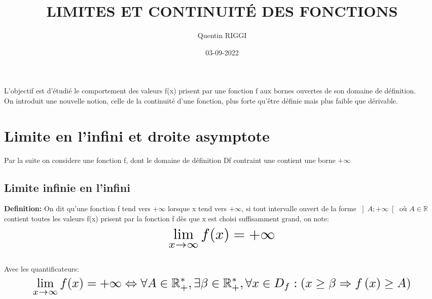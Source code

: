 \documentclass[a4paper, 12pt]{article}
\title{\color{darkred}\Huge LIMITES ET CONTINUITÉ DES FONCTIONS}
\date{03-09-2022}
\author{Quentin RIGGI}
\renewcommand\large{\color{text}}
\begin{document}
	\maketitle
	\large L'objectif est d'étudié le comportement des valeurs f(x) prisent par une fonction f aux bornes ouvertes de son domaine de définition.\\
	\large On introduit une nouvelle notion, celle de la continuité d'une fonction, plus forte qu'être définie mais plus faible que dérivable.
	
	\section{Limite en l'infini et droite asymptote}
	\large Par la suite on considere une fonction f, dont le domaine de définition Df contraint une contient une borne $+ \infty$ 

	\subsection{Limite infinie en l'infini}
	\textbf{\color{crimson}Definition:}
	\large On dit qu'une fonction f tend vers +$\infty$ lorsque x tend vers +$\infty$, si tout intervalle ouvert de la forme
	$\left]A; +\infty \right[$ où $A\in\mathbb{R}$ contient toutes les valeurs f(x) prisent par la fonction f dès que x est choisi suffisamment grand, on note:
	\begin{displaymath}
		\scaleto{\lim_{x\to\infty} f(x) = +\infty}{30pt}
	\end{displaymath}
	\\
	\large Avec les quantificateurs:
	\begin{displaymath}
		\scaleto{\lim_{x\to\infty} f(x) = +\infty \Leftrightarrow\forall A \in\mathbb{R}_{+}^{*},\exists\beta\in\mathbb{R}_{+}^{*},\forall x \in D_{f} : \left(x\geq\beta\Rightarrow f\left(x\right)\geq A \right)}{25pt}
	\end{displaymath}
	
\end{document}

